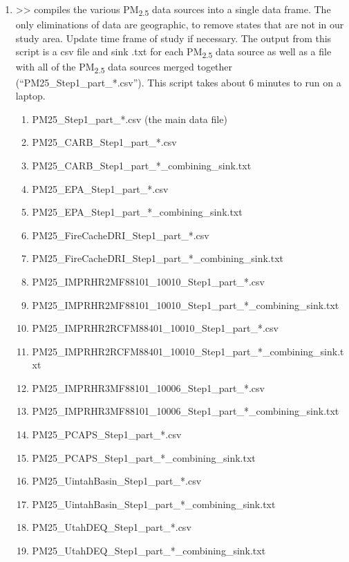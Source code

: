 \begin{enumerate}[nolistsep]
\item {} >> compiles the various PM\textsubscript{2.5} data sources into a single data frame. The only eliminations of data are geographic, to remove states that are not in our study area. Update time frame of study if necessary. The output from this script is a csv file and sink .txt for each  PM\textsubscript{2.5} data source as well as a file with all of the PM\textsubscript{2.5} data sources merged together (``PM25\_Step1\_part\_*.csv''). This script takes about 6 minutes to run on a laptop. %
\begin{enumerate}
\item PM25\_Step1\_part\_*.csv (the main data file)
\item PM25\_CARB\_Step1\_part\_*.csv
\item PM25\_CARB\_Step1\_part\_*\_combining\_sink.txt
\item PM25\_EPA\_Step1\_part\_*.csv
\item PM25\_EPA\_Step1\_part\_*\_combining\_sink.txt
\item PM25\_FireCacheDRI\_Step1\_part\_*.csv
\item PM25\_FireCacheDRI\_Step1\_part\_*\_combining\_sink.txt
\item PM25\_IMPRHR2MF88101\_10010\_Step1\_part\_*.csv
\item PM25\_IMPRHR2MF88101\_10010\_Step1\_part\_*\_combining\_sink.txt
\item PM25\_IMPRHR2RCFM88401\_10010\_Step1\_part\_*.csv
\item PM25\_IMPRHR2RCFM88401\_10010\_Step1\_part\_*\_combining\_sink.txt
\item PM25\_IMPRHR3MF88101\_10006\_Step1\_part\_*.csv
\item PM25\_IMPRHR3MF88101\_10006\_Step1\_part\_*\_combining\_sink.txt
\item PM25\_PCAPS\_Step1\_part\_*.csv
\item PM25\_PCAPS\_Step1\_part\_*\_combining\_sink.txt
\item PM25\_UintahBasin\_Step1\_part\_*.csv
\item PM25\_UintahBasin\_Step1\_part\_*\_combining\_sink.txt
\item PM25\_UtahDEQ\_Step1\_part\_*.csv
\item PM25\_UtahDEQ\_Step1\_part\_*\_combining\_sink.txt
\end{enumerate}


\end{enumerate}
